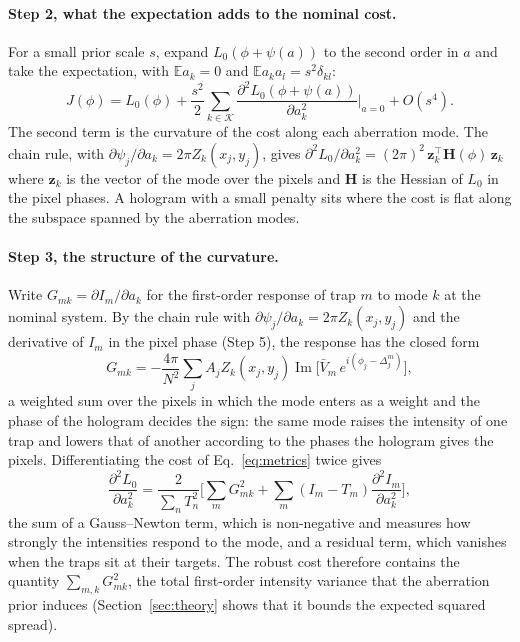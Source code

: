 \paragraph{Step 2, what the expectation adds to the nominal cost.} For a small prior scale $s$, expand $L_0(\phi+\psi(a))$ to the second order in $a$ and take the expectation, with $\mathbb E a_k=0$ and $\mathbb E a_ka_l=s^2\delta_{kl}$:
\begin{equation}
J(\phi)=L_0(\phi)+\frac{s^2}{2}\sum_{k\in\mathcal K}\frac{\partial^2L_0(\phi+\psi(a))}{\partial a_k^2}\Big|_{a=0}+O(s^4).\label{eq:taylor}
\end{equation}
The second term is the curvature of the cost along each aberration mode. The chain rule, with $\partial\psi_j/\partial a_k=2\pi Z_k(x_j,y_j)$, gives $\partial^2L_0/\partial a_k^2=(2\pi)^2\,\mathbf z_k^{\!\top}\mathbf H(\phi)\,\mathbf z_k$ where $\mathbf z_k$ is the vector of the mode over the pixels and
$\mathbf H$ is the Hessian of $L_0$ in the pixel phases. A hologram with a small penalty sits where the cost is flat along the subspace spanned by the aberration modes.

\paragraph{Step 3, the structure of the curvature.} Write $G_{mk}=\partial I_m/\partial a_k$ for the first-order response of trap $m$ to mode $k$ at the nominal system. By the chain rule with $\partial\psi_j/\partial a_k=2\pi Z_k(x_j,y_j)$ and the derivative of $I_m$ in the pixel phase (Step 5), the response has the closed form
\begin{equation}
G_{mk}=-\frac{4\pi}{N^2}\sum_jA_jZ_k(x_j,y_j)\operatorname{Im}\Big[\bar V_m\,e^{i(\phi_j-\Delta_j^m)}\Big],\label{eq:response}
\end{equation}
a weighted sum over the pixels in which the mode enters as a weight and the phase of the hologram decides the sign: the same mode raises the intensity of one trap and lowers that of another according to the phases the hologram gives the pixels. Differentiating the cost of Eq.~\eqref{eq:metrics} twice gives
\begin{equation}
\frac{\partial^2L_0}{\partial a_k^2}=\frac{2}{\sum_nT_n^2}\Big[\sum_mG_{mk}^2+\sum_m(I_m-T_m)\frac{\partial^2I_m}{\partial a_k^2}\Big],\label{eq:gaussnewton}
\end{equation}
the sum of a Gauss--Newton term, which is non-negative and measures how strongly the intensities respond to the mode, and a residual term, which vanishes when the traps sit at their targets. The robust cost therefore contains the quantity $\sum_{m,k}G_{mk}^2$, the total
first-order intensity variance that the aberration prior induces (Section~\ref{sec:theory} shows that it bounds the expected squared spread).

